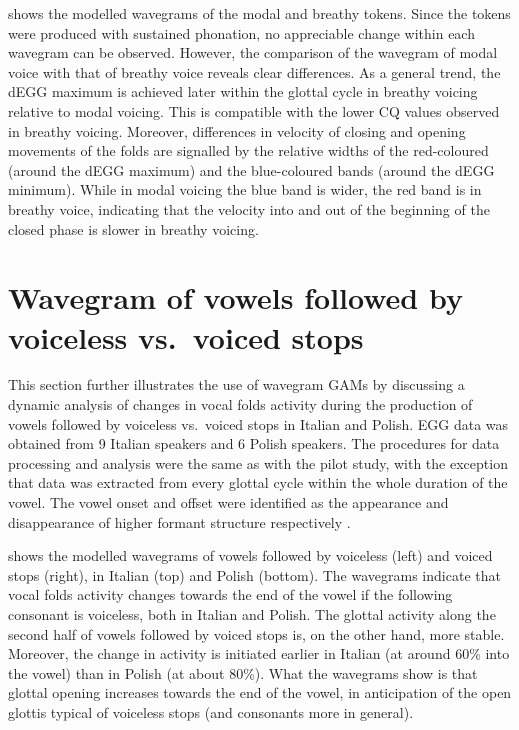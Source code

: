 \documentclass[12pt,a4paper,]{article}
\begin{document}
 shows the modelled wavegrams of the modal and breathy
tokens. Since the tokens were produced with sustained phonation, no
appreciable change within each wavegram can be observed. However, the
comparison of the wavegram of modal voice with that of breathy voice
reveals clear differences. As a general trend, the dEGG maximum is
achieved later within the glottal cycle in breathy voicing relative to
modal voicing. This is compatible with the lower CQ values observed in
breathy voicing. Moreover, differences in velocity of closing and
opening movements of the folds are signalled by the relative widths of
the red-coloured (around the dEGG maximum) and the blue-coloured bands
(around the dEGG minimum). While in modal voicing the blue band is
wider, the red band is in breathy voice, indicating that the velocity
into and out of the beginning of the closed phase is slower in breathy
voicing.

\hypertarget{wavegram-of-vowels-followed-by-voiceless-vs.-voiced-stops}{%
\section{Wavegram of vowels followed by voiceless vs.~voiced
stops}\label{wavegram-of-vowels-followed-by-voiceless-vs.-voiced-stops}}

This section further illustrates the use of wavegram GAMs by discussing
a dynamic analysis of changes in vocal folds activity during the
production of vowels followed by voiceless vs.~voiced stops in Italian
and Polish. EGG data was obtained from 9 Italian speakers and 6 Polish
speakers. The procedures for data processing and analysis were the same
as with the pilot study, with the exception that data was extracted from
every glottal cycle within the whole duration of the vowel. The vowel
onset and offset were identified as the appearance and disappearance of
higher formant structure respectively \citep{machac2009}.

 shows the modelled wavegrams of vowels followed by
voiceless (left) and voiced stops (right), in Italian (top) and Polish
(bottom). The wavegrams indicate that vocal folds activity changes
towards the end of the vowel if the following consonant is voiceless,
both in Italian and Polish. The glottal activity along the second half
of vowels followed by voiced stops is, on the other hand, more stable.
Moreover, the change in activity is initiated earlier in Italian (at
around 60\% into the vowel) than in Polish (at about 80\%). What the
wavegrams show is that glottal opening increases towards the end of the
vowel, in anticipation of the open glottis typical of voiceless stops
(and consonants more in general).
\end{document}
